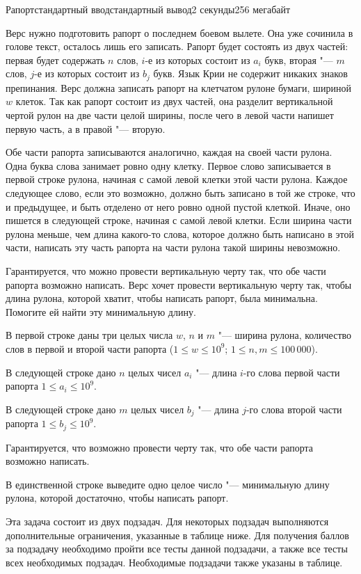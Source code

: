 \begin{problem}{Рапорт}{стандартный ввод}{стандартный вывод}{2 секунды}{256 мегабайт}

Верс нужно подготовить рапорт о последнем боевом вылете. Она уже сочинила в голове текст, осталось лишь его записать. Рапорт будет состоять из двух частей: первая будет содержать $n$ слов, $i$-е из которых состоит из $a_i$ букв, вторая "--- $m$ слов, $j$-е из которых состоит из $b_j$ букв. Язык Крии не содержит никаких знаков препинания. Верс должна записать рапорт на клетчатом рулоне бумаги, шириной $w$ клеток. Так как рапорт состоит из двух частей, она разделит вертикальной чертой рулон на две части целой ширины, после чего в левой части напишет первую часть, а в правой "--- вторую.

Обе части рапорта записываются аналогично, каждая на своей части рулона. Одна буква слова занимает ровно одну клетку. Первое слово записывается в первой строке рулона, начиная с самой левой клетки этой части рулона. Каждое следующее слово, если это возможно, должно быть записано в той же строке, что и предыдущее, и быть отделено от него ровно одной пустой клеткой. Иначе, оно пишется в следующей строке, начиная с самой левой клетки. Если ширина части рулона меньше, чем длина какого-то слова, которое должно быть написано в этой части, написать эту часть рапорта на части рулона такой ширины невозможно.

Гарантируется, что можно провести вертикальную черту так, что обе части рапорта возможно написать.
Верс хочет провести вертикальную черту так, чтобы длина рулона, которой хватит, чтобы написать рапорт, была минимальна. Помогите ей найти эту минимальную длину.

\InputFile
В первой строке даны три целых числа $w$, $n$ и $m$ "--- ширина рулона, количество слов в первой и второй части рапорта ($1 \le w \le 10^9$; $1 \le n, m \le 100\,000$).

В следующей строке дано $n$ целых чисел $a_i$ "--- длина $i$-го слова первой части рапорта $1 \le a_i \le 10^9$.

В следующей строке дано $m$ целых чисел $b_j$ "--- длина $j$-го слова второй части рапорта $1 \le b_j \le 10^9$.

Гарантируется, что возможно провести черту так, что обе части рапорта возможно написать.

\OutputFile
В единственной строке выведите одно целое число "--- минимальную длину рулона, которой достаточно, чтобы написать рапорт.

\Scoring
Эта задача состоит из двух подзадач. Для некоторых подзадач выполняются дополнительные ограничения, указанные в таблице ниже. Для получения баллов за подзадачу необходимо пройти все тесты данной подзадачи, а также все тесты всех необходимых подзадач. Необходимые подзадачи также указаны в таблице.


\end{problem}
